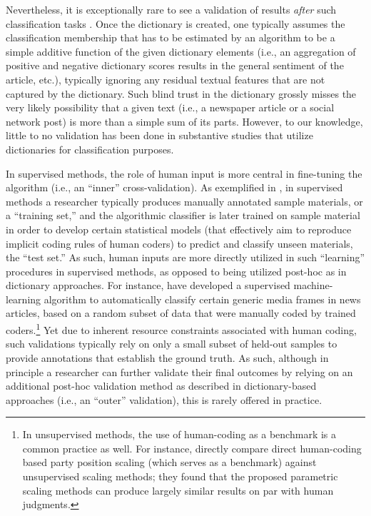 \documentclass[man, 12pt, a4paper, nolmodern, noextraspace]{apa6}
\begin{document}
    Nevertheless, it is exceptionally rare to see a validation of results \textit{after} such classification tasks \parencites[yet for notable exceptions, see][]{muddiman2018re, YoungSoroka2012, gonzalez2015signals}. Once the dictionary is created, one typically assumes the classification membership that has to be estimated by an algorithm to be a simple additive function of the given dictionary elements (i.e., an aggregation of positive and negative dictionary scores results in the general sentiment of the article, etc.), typically ignoring any residual textual features that are not captured by the dictionary. Such blind trust in the dictionary grossly misses the very likely possibility that a given text (i.e., a newspaper article or a social network post) is more than a simple sum of its parts. However, to our knowledge, little to no validation has been done in substantive studies that utilize dictionaries for classification purposes.
    
    In supervised methods, the role of human input is more central in fine-tuning the algorithm (i.e., an \enquote{inner} cross-validation). As exemplified in \textcite{scharkow2013thematic}, in supervised methods a researcher typically produces manually annotated sample materials, or a \enquote{training set,} and the algorithmic classifier is later trained on sample material in order to develop certain statistical models (that effectively aim to reproduce implicit coding rules of human coders) to predict and classify unseen materials, the \enquote{test set.} As such, human inputs are more directly utilized in such \enquote{learning} procedures in supervised methods, as opposed to being utilized post-hoc as in dictionary approaches. For instance, \textcite{burscher2014teaching} have developed a supervised machine-learning algorithm to automatically classify certain generic media frames in news articles, based on a random subset of data that were manually coded by trained coders.\footnote{ In unsupervised methods, the use of human-coding as a benchmark is a common practice as well. For instance, \textcite{lowe2013validating} directly compare direct human-coding based party position scaling (which serves as a benchmark) against unsupervised scaling methods; they found that the proposed parametric scaling methods can produce largely similar results on par with human judgments.} Yet due to inherent resource constraints associated with human coding, such validations typically rely on only a small subset of held-out samples to provide annotations that establish the ground truth. As such, although in principle a researcher can further validate their final outcomes by relying on an additional post-hoc validation method as described in dictionary-based approaches (i.e., an \enquote{outer} validation), this is rarely offered in practice.   
    
\end{document}
